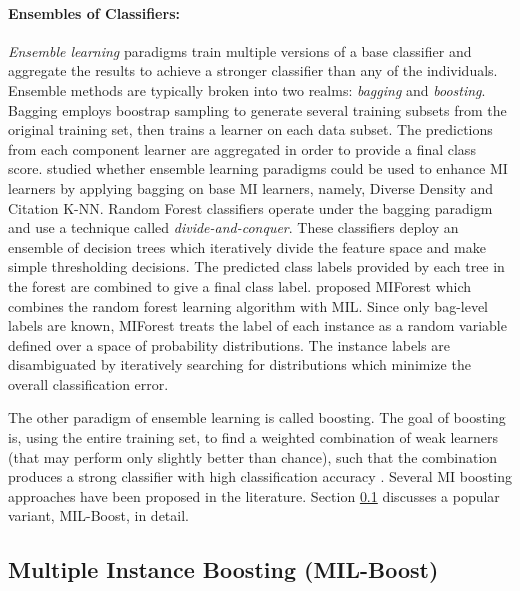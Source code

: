\paragraph{Ensembles of Classifiers:}
\textit{Ensemble learning} paradigms train multiple versions of a base classifier and aggregate the results to achieve a stronger classifier than any of the individuals.  Ensemble methods are typically broken into two realms: \textit{bagging} and \textit{boosting}.  Bagging employs boostrap sampling to generate several training subsets from the original training set, then trains a learner on each data subset.  The predictions from each component learner are aggregated in order to provide a final class score.  \cite{Zhou2003MIEnsemble} studied whether ensemble learning paradigms could be used to enhance MI learners by applying bagging on base MI learners, namely, Diverse Density and Citation K-NN.  Random Forest classifiers operate under the bagging paradigm and use a technique called \textit{divide-and-conquer}.  These classifiers deploy an ensemble of decision trees which iteratively divide the feature space and make simple thresholding decisions.  The predicted class labels provided by each tree in the forest are combined to give a final class label.  \cite{Leistner2010MIForests} proposed MIForest which combines the random forest learning algorithm with MIL.  Since only bag-level labels are known, MIForest treats the label of each instance as a random variable defined over a space of probability distributions.  The instance labels are disambiguated by iteratively searching for distributions which minimize the overall classification error.  

The other paradigm of ensemble learning is called boosting. The goal of boosting is, using the entire training set, to find a  weighted combination of weak learners (that may perform only slightly better than chance), such that the combination produces a strong classifier with high classification accuracy \citep{Zhang2006MIBoosting}. Several MI boosting approaches have been proposed in the literature.  Section \ref{sec:MILBoost} discusses a popular variant, MIL-Boost, in detail.


\subsection{Multiple Instance Boosting (MIL-Boost)} \label{sec:MILBoost}

